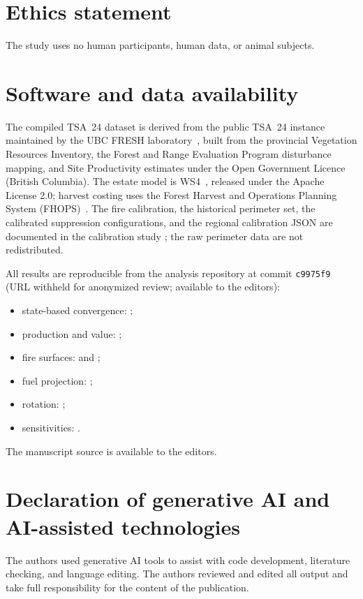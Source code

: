 \section*{Ethics statement}

The study uses no human participants, human data, or animal subjects.

\section*{Software and data availability}

The compiled TSA~24 dataset is derived from the public TSA~24 instance maintained by the UBC
FRESH laboratory~\citep{femic_tsa24_2026}, built from the provincial Vegetation Resources
Inventory, the Forest and Range Evaluation Program disturbance mapping, and Site Productivity
estimates under the Open Government Licence (British Columbia). The estate model is
WS4~\citep{ubc_fresh_ws4_2026}, released under the Apache License 2.0; harvest costing uses the
Forest Harvest and Operations Planning System (FHOPS)~\citep{fhops_2026}. The fire calibration, the
historical perimeter set, the calibrated suppression configurations, and the regional calibration
JSON are documented in the calibration study \citep{ubc_fresh_fire_calibration_2026}; the raw
perimeter data are not redistributed.

All results are reproducible from the analysis repository at commit \texttt{c9975f9} (URL withheld
for anonymized review; available to the editors):
\begin{itemize}
\item state-based convergence: ;
\item production and value: ;
\item fire surfaces: 
and ;
\item fuel projection: ;
\item rotation: ;
\item sensitivities: .
\end{itemize}
The manuscript source is available to the editors.

\section*{Declaration of generative AI and AI-assisted technologies}

The authors used generative AI tools to assist with code development, literature checking, and
language editing. The authors reviewed and edited all output and take full responsibility for the
content of the publication.
